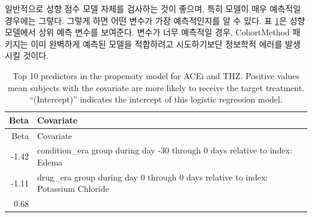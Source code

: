 \documentclass[11pt]{book}
\theoremstyle{definition}
\theoremstyle{definition}
\theoremstyle{definition}
\theoremstyle{remark}
\begin{document}
일반적으로 성향 점수 모델 자체를 검사하는 것이 좋으며, 특히 모델이 매우
예측적일 경우에는 그렇다. 그렇게 하면 어떤 변수가 가장 예측적인지를 알
수 있다. 표 \ref{tab:psModel}은 성향 모델에서 상위 예측 변수를 보여준다.
변수가 너무 예측적일 경우, CohortMethod 패키지는 이미 완벽하게 예측된
모델을 적합하려고 시도하기보단 정보학적 에러를 발생시킬 것이다.

\begin{longtable}[]{@{}rl@{}}
\caption{\label{tab:psModel} Top 10 predictors in the propensity model for
ACEi and THZ. Positive values mean subjects with the covariate are more
likely to receive the target treatment. ``(Intercept)'' indicates the
intercept of this logistic regression model.}\tabularnewline
\toprule
\begin{minipage}[b]{0.07\columnwidth}\raggedleft\strut
Beta\strut
\end{minipage} & \begin{minipage}[b]{0.87\columnwidth}\raggedright\strut
Covariate\strut
\end{minipage}\tabularnewline
\midrule
\endfirsthead
\toprule
\begin{minipage}[b]{0.07\columnwidth}\raggedleft\strut
Beta\strut
\end{minipage} & \begin{minipage}[b]{0.87\columnwidth}\raggedright\strut
Covariate\strut
\end{minipage}\tabularnewline
\midrule
\endhead
\begin{minipage}[t]{0.07\columnwidth}\raggedleft\strut
-1.42\strut
\end{minipage} & \begin{minipage}[t]{0.87\columnwidth}\raggedright\strut
condition\_era group during day -30 through 0 days relative to index:
Edema\strut
\end{minipage}\tabularnewline
\begin{minipage}[t]{0.07\columnwidth}\raggedleft\strut
-1.11\strut
\end{minipage} & \begin{minipage}[t]{0.87\columnwidth}\raggedright\strut
drug\_era group during day 0 through 0 days relative to index: Potassium
Chloride\strut
\end{minipage}\tabularnewline
\begin{minipage}[t]{0.07\columnwidth}\raggedleft\strut
0.68\strut
\end{minipage} & \begin{minipage}[t]{0.87\columnwidth}\raggedright\strut

\end{minipage}
\end{longtable}
\end{document}
